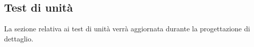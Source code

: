 \subsection{Test di unità}

\par La sezione relativa ai test di unità verrà aggiornata durante la progettazione di dettaglio.